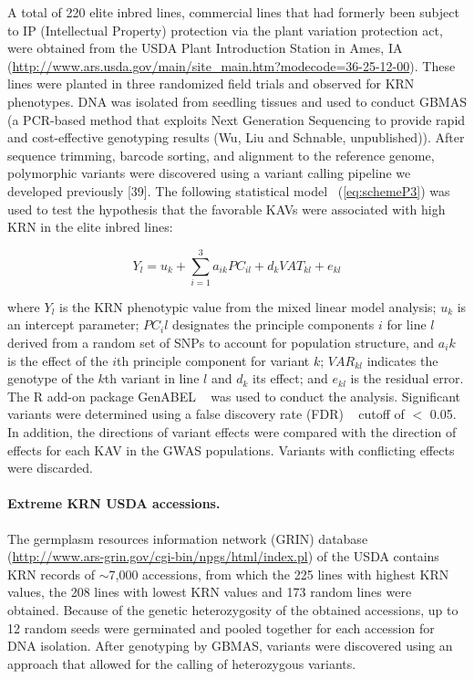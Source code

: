 \documentclass[10pt,letterpaper]{article}
\begin{document}
A total of 220 elite inbred lines, commercial lines that had formerly been subject to IP (Intellectual Property) protection via the plant variation protection act, were obtained from the USDA Plant Introduction Station in Ames, IA (\url{http://www.ars.usda.gov/main/site_main.htm?modecode=36-25-12-00}). These lines were planted in three randomized field trials and observed for KRN phenotypes. DNA was isolated from seedling tissues and used to conduct GBMAS (a PCR-based method that exploits Next Generation Sequencing to provide rapid and cost-effective genotyping results (Wu, Liu and Schnable, unpublished)). After sequence trimming, barcode sorting, and alignment to the reference genome, polymorphic variants were discovered using a variant calling pipeline we developed previously [39].
%
The following statistical model ~(\ref{eq:schemeP3}) was used to test the hypothesis that the favorable KAVs were associated with high KRN in the elite inbred lines:

\begin{equation}\label{eq:schemeP3} 
Y_l = u_k + \sum_{i=1}^3 a_{ik}PC_{il} + d_kVAT_{kl} + e_{kl}
\end{equation}

where $Y_l$ is the KRN phenotypic value from the mixed linear model analysis; $u_k$ is an intercept parameter; $PC_il$ designates the principle components $i$ for line $l$ derived from a random set of SNPs to account for population structure, and $a_ik$ is the effect of the $i$th principle component for variant $k$; $VAR_{kl}$ indicates the genotype of the $k$th variant in line $l$ and $d_k$ its effect; and $e_{kl}$ is the residual error. The R add-on package GenABEL ~\cite{Aulchenko2007} was used to conduct the analysis. Significant variants were determined using a false discovery rate (FDR) ~\cite{Benjamini1995} cutoff of $<$ 0.05. In addition, the directions of variant effects were compared with the direction of effects for each KAV in the GWAS populations. Variants with conflicting effects were discarded. 

\paragraph{Extreme KRN USDA accessions.}
The germplasm resources information network (GRIN) database (\url{http://www.ars-grin.gov/cgi-bin/npgs/html/index.pl}) of the USDA contains KRN records of $\sim$7,000 accessions, from which the 225 lines with highest KRN values, the 208 lines with lowest KRN values and 173 random lines were obtained. Because of the genetic heterozygosity of the obtained accessions, up to 12 random seeds were germinated and pooled together for each accession for DNA isolation. After genotyping by GBMAS, variants were discovered using an approach that allowed for the calling of heterozygous variants.
\end{document}

